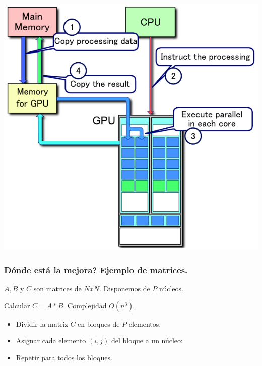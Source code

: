\documentclass{beamer}
\begin{document}
\begin{frame}
\includegraphics[width=\linewidth]{flow.png}
\end{frame}



\begin{frame}
\frametitle{Dónde está la mejora? Ejemplo de matrices.}

$A, B$ y $C$ son matrices de $NxN$. Disponemos de $P$ núcleos.

Calcular $C = A * B$. Complejidad $ O(n^3) $.


\begin{itemize}
\item Dividir la matriz $C$ en bloques de $P$ elementos.
\item Asignar cada elemento $(i,j)$ del bloque a un núcleo:
\item Repetir para todos los bloques.
\end{itemize}

\end{frame}
\end{document}
